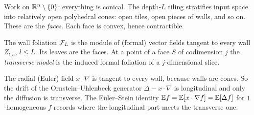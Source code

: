 \label{sec:walls}
Work on $\mathbb R^n\setminus\{0\}$; everything is conical. The depth-$L$ tiling stratifies input space into relatively open polyhedral cones:
open tiles, open pieces of walls, and so on. These are the \emph{faces}. Each face is convex, hence contractible.
\begin{definition}
The wall foliation $\mathcal F_L$ is the module of (formal) vector fields tangent to every wall $Z_{l,a}$, $l\le L$. Its leaves are the faces.
At a point of a face $S$ of codimension $j$ the \emph{transverse model} is the induced formal foliation of a $j$-dimensional slice.
\end{definition}
The radial (Euler) field $x\cdot\nabla$ is tangent to every wall, because walls are cones. So the drift of the Ornstein--Uhlenbeck generator
$\Delta-x\cdot\nabla$ is longitudinal and only the diffusion is transverse. The Euler--Stein identity $\mathbb E f=\mathbb E[x\cdot\nabla f]=\mathbb E[\Delta f]$ for
$1$-homogeneous $f$ records where the longitudinal part meets the transverse one.

